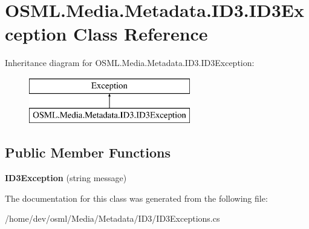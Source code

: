 \hypertarget{classOSML_1_1Media_1_1Metadata_1_1ID3_1_1ID3Exception}{}\section{O\+S\+M\+L.\+Media.\+Metadata.\+I\+D3.\+I\+D3\+Exception Class Reference}
\label{classOSML_1_1Media_1_1Metadata_1_1ID3_1_1ID3Exception}
Inheritance diagram for O\+S\+M\+L.\+Media.\+Metadata.\+I\+D3.\+I\+D3\+Exception\+:\begin{figure}[H]
\begin{center}
\leavevmode
\includegraphics[height=2.000000cm]{classOSML_1_1Media_1_1Metadata_1_1ID3_1_1ID3Exception}
\end{center}
\end{figure}
\subsection*{Public Member Functions}
\begin{DoxyCompactItemize}
\item 
\mbox{\label{classOSML_1_1Media_1_1Metadata_1_1ID3_1_1ID3Exception_a4352c9be7af6e5cf9244c4193e065c1c}} 
{\bfseries I\+D3\+Exception} (string message)
\end{DoxyCompactItemize}


The documentation for this class was generated from the following file\+:\begin{DoxyCompactItemize}
\item 
/home/dev/osml/\+Media/\+Metadata/\+I\+D3/I\+D3\+Exceptions.\+cs\end{DoxyCompactItemize}

